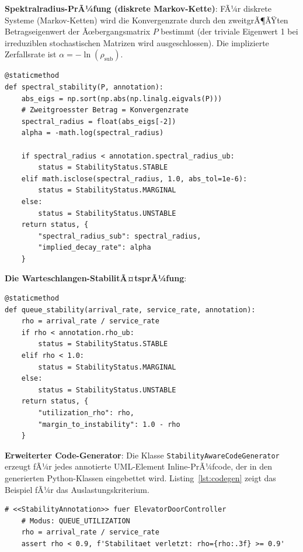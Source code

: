 ﻿\documentclass[a4paper,12pt]{report}
\theoremstyle{definition}
\begin{document}
\textbf{Spektralradius-PrÃ¼fung (diskrete Markov-Kette)}:
FÃ¼r diskrete Systeme (Markov-Ketten) wird die Konvergenzrate durch den
zweitgrÃ¶ÃŸten Betragseigenwert der Ãœbergangsmatrix $P$ bestimmt
(der triviale Eigenwert 1 bei irreduziblen stochastischen Matrizen wird
ausgeschlossen). Die implizierte Zerfallsrate ist
$\alpha = -\ln(\rho_{\text{sub}})$.

\begin{lstlisting}[style=python,
	caption={Spektralradius-StabilitÃ¤tsprÃ¼fung fÃ¼r Markov-Ketten},
	label={lst:spectral}]
@staticmethod
def spectral_stability(P, annotation):
	abs_eigs = np.sort(np.abs(np.linalg.eigvals(P)))
	# Zweitgroesster Betrag = Konvergenzrate
	spectral_radius = float(abs_eigs[-2])
	alpha = -math.log(spectral_radius)
	
	if spectral_radius < annotation.spectral_radius_ub:
		status = StabilityStatus.STABLE
	elif math.isclose(spectral_radius, 1.0, abs_tol=1e-6):
		status = StabilityStatus.MARGINAL
	else:
		status = StabilityStatus.UNSTABLE
	return status, {
		"spectral_radius_sub": spectral_radius,
		"implied_decay_rate": alpha
	}
\end{lstlisting}

\textbf{Die Warteschlangen-StabilitÃ¤tsprÃ¼fung}:
\begin{lstlisting}[style=python,
	caption={AuslastungsprÃ¼fung fÃ¼r M/M/1-Warteschlangen},
	label={lst:queue}]
@staticmethod
def queue_stability(arrival_rate, service_rate, annotation):
	rho = arrival_rate / service_rate
	if rho < annotation.rho_ub:
		status = StabilityStatus.STABLE
	elif rho < 1.0:
		status = StabilityStatus.MARGINAL
	else:
		status = StabilityStatus.UNSTABLE
	return status, {
		"utilization_rho": rho,
		"margin_to_instability": 1.0 - rho
	}
\end{lstlisting}

\textbf{Erweiterter Code-Generator}:
Die Klasse \texttt{StabilityAwareCodeGenerator} erzeugt fÃ¼r jedes annotierte
UML-Element Inline-PrÃ¼fcode, der in den generierten Python-Klassen
eingebettet wird. Listing~\ref{lst:codegen} zeigt das Beispiel fÃ¼r das
Auslastungskriterium.

\begin{lstlisting}[style=python,
	caption={Generierter StabilitÃ¤ts-Check-Code (Auslastungsmodus)},
	label={lst:codegen}]
	# <<StabilityAnnotation>> fuer ElevatorDoorController
	# Modus: QUEUE_UTILIZATION
	rho = arrival_rate / service_rate
	assert rho < 0.9, f'Stabilitaet verletzt: rho={rho:.3f} >= 0.9'
\end{lstlisting}
\end{document}
